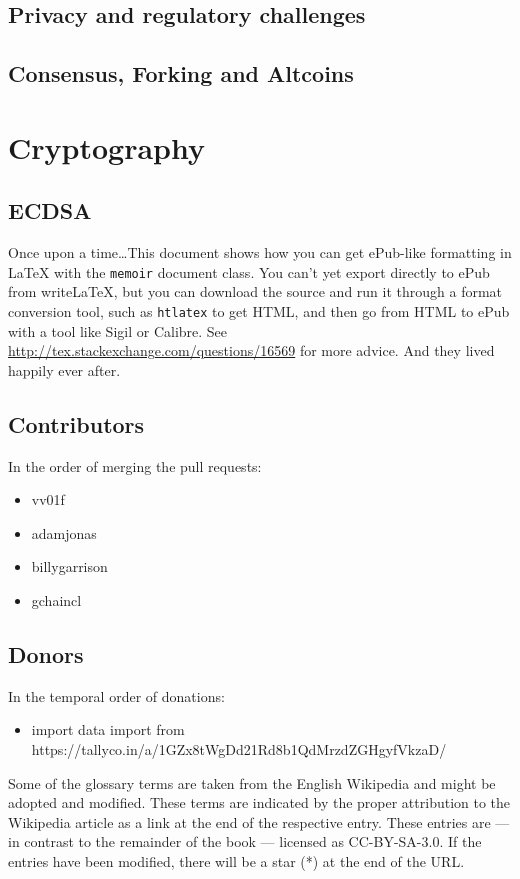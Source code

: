\documentclass[a4paper,12pt,oneside,openany]{book}
\begin{document}
\section{Privacy and regulatory challenges}
\section{Consensus, Forking and Altcoins}


\appendix
\chapter{Cryptography}
\section{ECDSA}

Once upon a time\ldots This document shows how you can get ePub-like formatting in \LaTeX{} with the \verb|memoir| document class. You can't yet export directly to ePub from writeLaTeX, but you can download the source and run it through a format conversion tool, such as \verb|htlatex| to get HTML, and then go from HTML to ePub with a tool like Sigil or Calibre. See \url{http://tex.stackexchange.com/questions/16569} for more advice. And they lived happily ever after.

\appendix
\section{Contributors}
In the order of merging the pull requests:
\begin{itemize}
\item vv01f
\item adamjonas
\item billygarrison
\item gchaincl
\end{itemize}

\section{Donors}
In the temporal order of donations:
\begin{itemize}
\item import data import from https://tallyco.in/a/1GZx8tWgDd21Rd8b1QdMrzdZGHgyfVkzaD/


\end{itemize}

\glsaddall

Some of the glossary terms are taken from the English Wikipedia and might be adopted and modified. These terms are indicated by the proper attribution to the Wikipedia article as a link at the end of the respective entry. These entries are --- in contrast to the remainder of the book --- licensed as CC-BY-SA-3.0. If the entries have been modified, there will be a star (*) at the end of the URL.

\printnoidxglossaries
\end{document}

